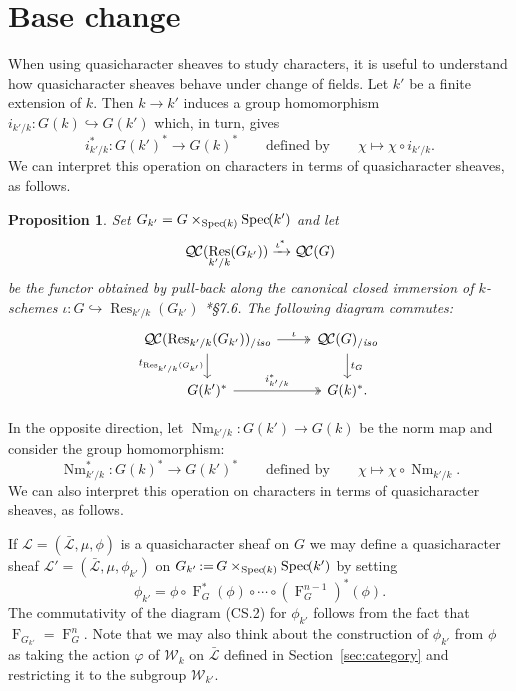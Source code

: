\documentclass[11pt]{amsart}
\theoremstyle{plain}
\newtheorem{proposition}[theorem]{Proposition}
\theoremstyle{definition}
\theoremstyle{remark}
\newcommand{\Spec}[1]{{\operatorname{Spec}\hskip-1pt( #1 )}}
\newcommand{\Frob}[1]{\operatorname{F}_{#1}}
\DeclareMathOperator{\Res}{Res}
\DeclareMathOperator{\Nm}{Nm}
\newcommand{\ceq}{{\, :=\, }}
\newcommand{\cs}[1]{{\mathcal{#1}}}
\newcommand{\gcs}[1]{{\mathcal{\bar #1}}}
\newcommand{\QC}{{\mathcal{Q\hskip-0.8pt C}}}
\newcommand{\QCiso}[1]{\QC(#1)_{/\textit{iso}}}
\newcommand{\Weil}[1]{\mathcal{W}_{#1}}
\newcommand{\trFrob}[1]{t_{#1}}
\begin{document}
\section{Base change}\label{sec:basechange}

When using quasicharacter sheaves to study characters, it is useful to understand
how quasicharacter sheaves behave under change of fields.
Let $k'$ be a finite extension of $k$. Then $k\to k'$ induces a group homomorphism $i_{k'/k} : G(k) \hookrightarrow G(k')$ which, in turn, gives
\[
i_{k'/k}^* : G(k')^* \to G(k)^* \qquad \text{defined by}\qquad \chi \mapsto \chi\circ i_{k'/k}.
\]
We can interpret this operation on characters in terms of quasicharacter sheaves, as follows.
%

\begin{proposition} \label{prop:csbe}
Set $G_{k'} = G\times_\Spec{k} \Spec{k'}$ and let
\[
\QC(\Res_{k'/k}(G_{k'})) \xrightarrow{\iota^*} \QC(G)
\]
be the functor obtained by pull-back along the canonical closed immersion of $k$-schemes  $\iota : G \hookrightarrow \Res_{k'/k}(G_{k'})$ \cite{bosch-lutkebohmert-reynaud:NeronModels}*{\S 7.6}. 
The following diagram commutes:
\[
\begin{tikzcd}
\QCiso{\Res_{k'/k}(G_{k'})} \arrow[two heads]{r}{\iota} \dar[swap]{\trFrob{\Res_{k'/k}(G_{k'})}} & \QCiso{G} \dar{\trFrob{G}} \\
G(k')^* \arrow[two heads]{r}{i_{k'/k}^*} & G(k)^*.
\end{tikzcd}
\]
\end{proposition}

In the opposite direction, let $\Nm_{k'/k} : G(k') \to G(k)$ be the norm map and consider the group homomorphism:
\[
\Nm_{k'/k}^* : G(k)^* \to G(k')^* \qquad \text{defined by}\qquad \chi \mapsto \chi\circ \Nm_{k'/k}.
\]
We can also interpret this operation on characters in terms of quasicharacter sheaves, as follows.

If $\cs{L} = (\gcs{L}, \mu, \phi)$ is a quasicharacter sheaf on $G$ we may define
a quasicharacter sheaf $\cs{L}' = (\gcs{L}, \mu, \phi_{k'})$ on 
$G_{k'}\ceq G\times_{\Spec{k}} \Spec{k'}$ by setting
\[
\phi_{k'} = \phi \circ \Frob{G}^*(\phi) \circ \cdots \circ (\Frob{G}^{n-1})^*(\phi).
\]
The commutativity of the diagram (CS.2) for $\phi_{k'}$ 
follows from the fact that $\Frob{G_{k'}} = \Frob{G}^n$.
Note that we may also think about the construction of $\phi_{k'}$ from $\phi$
as taking the action $\varphi$ of $\Weil{k}$ on $\gcs{L}$ 
defined in Section~\ref{sec:category} and restricting it to the subgroup $\Weil{k'}$.
\end{document}
